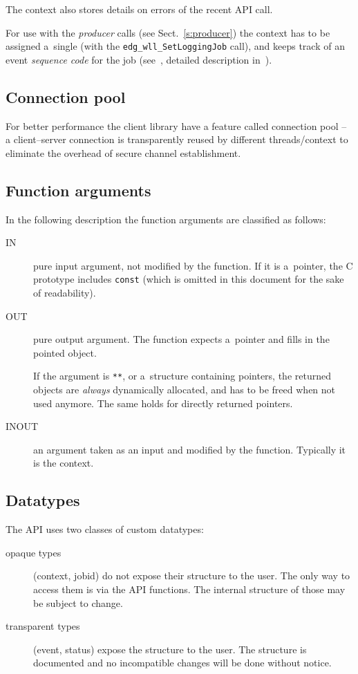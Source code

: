 The context also stores details on errors of the recent API call.

For use with the \emph{producer} calls (see Sect.~\ref{s:producer})
the context has to be assigned a~single \jobid
(with the \verb'edg_wll_SetLoggingJob' call),
and keeps track of an event \emph{sequence code} for the job 
(see~\cite{LBUG}, detailed description in~\cite{lbarch}).


\subsection{Connection pool}
For better performance the \LB client library have a feature called
connection pool -- a client--server connection is transparently reused
by different threads/context to eliminate the overhead of secure
channel establishment.

\subsection{Function arguments}
In the following description the function arguments are classified as follows:
\begin{description}
\item[IN] pure input argument, not modified by the function.
If it is a~pointer, the C prototype includes \verb'const' (which is omitted in
this document for the sake of readability).
\item[OUT] pure output argument. The function expects a~pointer and fills in
the pointed object.

If the argument is \verb'**', or a~structure containing pointers,
the returned objects are \emph{always} dynamically allocated,
and has to be freed when not used anymore.
The same holds for directly returned pointers.

\item[INOUT] an argument taken as an input and modified by the function.
Typically it is the \LB context.

\end{description}

\subsection{Datatypes}
The API uses two classes of custom datatypes:
\begin{description}
\item[opaque types] (\eg context, jobid) do not expose their structure
to the user.
The only way to access them is via the API functions.
The internal structure of those may be subject to change.

\item[transparent types] (\eg event, status) expose the structure to the
user. The structure is documented and no incompatible changes will be done
without notice.
\end{description}

